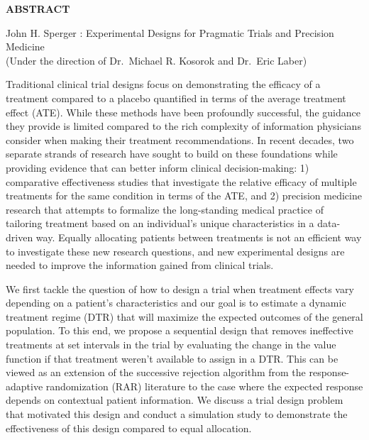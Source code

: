 \documentclass[12pt,,letterpaper,twoside]{report}
\begin{document}
\begin{center}
\vspace*{52pt}
{\normalsize \textbf{ABSTRACT}}
\vspace{11pt}

\begin{singlespace}
 John H. Sperger : Experimental Designs for Pragmatic Trials and
Precision Medicine \\
(Under the direction of   Dr.~Michael R. Kosorok and  Dr.~Eric Laber)
\end{singlespace}
\end{center}

Traditional clinical trial designs focus on demonstrating the efficacy
of a treatment compared to a placebo quantified in terms of the average
treatment effect (ATE). While these methods have been profoundly
successful, the guidance they provide is limited compared to the rich
complexity of information physicians consider when making their
treatment recommendations. In recent decades, two separate strands of
research have sought to build on these foundations while providing
evidence that can better inform clinical decision-making: 1) comparative
effectiveness studies that investigate the relative efficacy of multiple
treatments for the same condition in terms of the ATE, and 2) precision
medicine research that attempts to formalize the long-standing medical
practice of tailoring treatment based on an individual's unique
characteristics in a data-driven way. Equally allocating patients
between treatments is not an efficient way to investigate these new
research questions, and new experimental designs are needed to improve
the information gained from clinical trials.

We first tackle the question of how to design a trial when treatment effects vary depending
on a patient's characteristics and our goal is to estimate a dynamic
treatment regime (DTR) that will maximize the expected outcomes of the
general population. To this end, we propose a sequential design that
removes ineffective treatments at set intervals in the trial by
evaluating the change in the value function if that treatment weren't
available to assign in a DTR. This can be viewed as an extension of the
successive rejection algorithm from the response-adaptive randomization
(RAR) literature to the case where the expected response depends on
contextual patient information. We discuss a trial design problem that
motivated this design and conduct a simulation study to demonstrate the
effectiveness of this design compared to equal allocation. 
\end{document}
